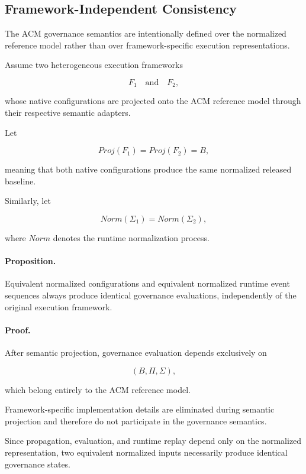 \documentclass[10pt]{article}
\begin{document}
\subsection{Framework-Independent Consistency}
\label{appendix:framework_independent_consistency}

The ACM governance semantics are intentionally defined over the normalized
reference model rather than over framework-specific execution representations.

Assume two heterogeneous execution frameworks

\[
F_1
\quad\text{and}\quad
F_2,
\]

whose native configurations are projected onto the ACM reference model through
their respective semantic adapters.

Let

\[
Proj(F_1)
=
Proj(F_2)
=
B,
\]

meaning that both native configurations produce the same normalized released
baseline.

Similarly, let

\[
Norm(\Sigma_1)
=
Norm(\Sigma_2),
\]

where
$Norm$
denotes the runtime normalization process.

\paragraph*{Proposition.}

Equivalent normalized configurations and equivalent normalized runtime event
sequences always produce identical governance evaluations, independently of the
original execution framework.

\paragraph*{Proof.}

After semantic projection, governance evaluation depends exclusively on

\[
(B,\Pi,\Sigma),
\]

which belong entirely to the ACM reference model.

Framework-specific implementation details are eliminated during semantic
projection and therefore do not participate in the governance semantics.

Since propagation, evaluation, and runtime replay depend only on the normalized
representation, two equivalent normalized inputs necessarily produce identical
governance states.
\end{document}
